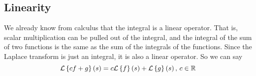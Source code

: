 \subsection{Linearity}
\noindent
We already know from calculus that the integral is a linear operator. That is, scalar multiplication can be pulled out of the integral, and the integral of the sum of two functions is the same as the sum of the integrals of the functions. Since the Laplace transform is just an integral, it is also a linear operator. So we can say
\begin{equation*}
	\mathcal{L}\left\{ cf + g \right\}\left(s\right) = c\mathcal{L}\left\{ f \right\}\left(s\right) + \mathcal{L}\left\{ g \right\}\left(s\right) \text{, } c \in \mathbb{R}
\end{equation*}